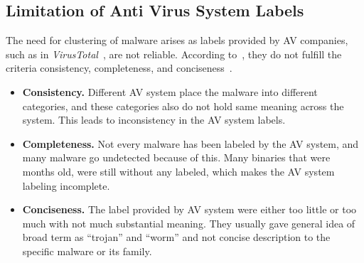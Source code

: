 \subsection{Limitation of Anti Virus System Labels}
\label{sub:Limitation of Anti Virus System Labels}
The need for clustering of malware arises as labels provided by AV companies, such as in \emph{VirusTotal}~\cite[]{virustotal}, are not reliable.
According to~\citeauthor{bailey}, they do not fulfill the criteria consistency, completeness, and conciseness~\cite[]{bailey}.
\begin{itemize}
\item \textbf{Consistency.} Different AV system place the malware into different categories, and these categories also do not hold same meaning across the system.
This leads to inconsistency in the AV system labels.
\item \textbf{Completeness.} Not every malware has been labeled by the AV system, and many malware go undetected because of this.
Many binaries that were months old, were still without any labeled, which makes the AV system labeling incomplete.
\item \textbf{Conciseness.} The label provided by AV system were either too little or too much with not much substantial meaning.
They usually gave general idea of broad term as ``trojan'' and ``worm'' and not concise description to the specific malware or its family.
\end{itemize}
